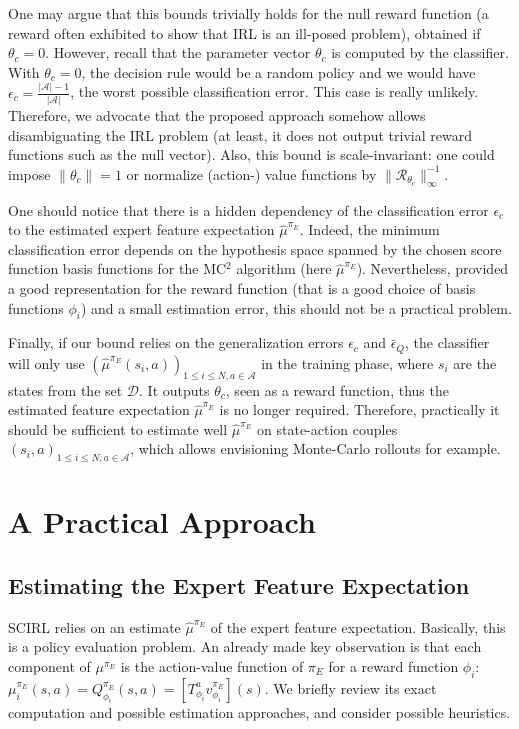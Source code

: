 \documentclass[english,utf8]{./hermes-journal}
\newcommand{\R}{\mathcal{R}}
\newcommand{\A}{\mathcal{A}}
\newcommand{\D}{\mathcal{D}}
\begin{document}
One may argue that this bounds trivially holds for the null reward
function (a reward often exhibited to show that IRL is an ill-posed
problem), obtained if $\theta_c=0$. However, recall that the
parameter vector $\theta_c$ is computed by the classifier. With
$\theta_c=0$, the decision rule would be a random policy and we
would have $\epsilon_c = \frac{|\A|-1}{|\A|}$, the worst possible
classification error. This case is really unlikely. Therefore, we
advocate that the proposed approach somehow allows disambiguating
the IRL problem (at least, it does not output trivial reward
functions such as the null vector).
%
Also, this bound is scale-invariant: one could impose
$\|\theta_c\|=1$ or normalize (action-) value functions by
$\|\R_{\theta_c}\|_\infty^{-1}$.

One should notice that there is a hidden dependency of the
classification error $\epsilon_c$ to the estimated expert feature
expectation $\hat{\mu}^{\pi_E}$. Indeed, the minimum classification
error depends on the hypothesis space spanned by the chosen score
function basis functions for the MC$^2$ algorithm (here
$\hat{\mu}^{\pi_E}$). Nevertheless, provided a good representation
for the reward function (that is a good choice of basis functions
$\phi_i$) and a small estimation error, this should not be a
practical problem.

Finally, if our bound relies on the generalization errors
$\epsilon_c$ and $\bar{\epsilon}_Q$, the classifier will only use
$(\hat{\mu}^{\pi_E}(s_i,a))_{1\leq i\leq N,a\in\A}$ in the training
phase, where $s_i$ are the states from the set $\D$. It outputs
$\theta_c$, seen as a reward function, thus the estimated feature
expectation $\hat{\mu}^{\pi_E}$ is no longer required. Therefore,
practically it should be sufficient to estimate well
$\hat{\mu}^{\pi_E}$ on state-action couples $(s_i,a)_{1\leq i\leq
N,a\in\A}$, which allows envisioning Monte-Carlo rollouts for
example.

\section{A Practical Approach}
\label{sec:practicalApproach}

\subsection{Estimating the Expert Feature Expectation}
\label{subsec:practicalApproach:muE}

SCIRL relies on an estimate $\hat{\mu}^{\pi_E}$ of the expert
feature expectation. Basically, this is a policy evaluation problem.
An already made key observation is that each component of
$\mu^{\pi_E}$ is the action-value function of $\pi_E$ for a reward
function $\phi_i$: $\mu_i^{\pi_E}(s,a) = Q^{\pi_E}_{\phi_i}(s,a) =
[T^a_{\phi_i} v^{\pi_E}_{\phi_i}](s)$. We briefly review its exact
computation and possible estimation approaches, and consider
possible heuristics.
\end{document}
